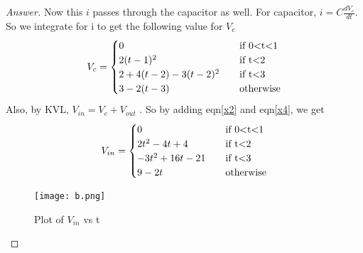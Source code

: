 \documentclass[12pt]{article}
\begin{document}
\begin{proof}[Answer]
Now this $i$ passes through the capacitor as well. For capacitor, $i = C\frac{dV_c}{dt}$. So we integrate for i to get the following value for $V_c$ 
\begin{equation}
V_c = \begin{cases}
        0 &\quad\text{if 0\textless t\textless1}\\
        2(t-1)^2 &\quad\text{if t\textless2}\\
        2+4(t-2)-3(t-2)^2 &\quad\text{if t\textless3}\\
        3-2(t-3) &\quad\text{otherwise}\\
            \end{cases}
    \label{x4}
\end{equation}
Also, by KVL, $V_{in} = V_c + V_{out}$ . So by adding eqn\ref{x2} and eqn\ref{x4}, we get
\begin{equation}
V_{in} = \begin{cases}
        0 &\quad\text{if 0\textless t\textless1}\\
        2t^2-4t+4 &\quad\text{if t\textless2}\\
        -3t^2+16t-21 &\quad\text{if t\textless3}\\
        9-2t &\quad\text{otherwise}\\
            \end{cases}
    \label{x5}
\end{equation}

\begin{figure}[H]
\centering
{\texttt{[image: b.png]}}\\
 \caption{Plot of $V_{in}$ vs t }
 \label{ann2}
\end{figure}


\end{proof}
\end{document}
